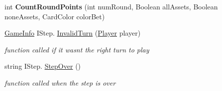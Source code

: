 \begin{DoxyCompactItemize}
\item 
\mbox{\label{class_coinche_1_1_tricks_abd2bd2645b75d22a8c0d96134916c576}} 
int {\bfseries Count\+Round\+Points} (int num\+Round, Boolean all\+Assets, Boolean none\+Assets, Card\+Color color\+Bet)
\item 
\hyperlink{class_coinche_1_1_tools_1_1_game_info}{Game\+Info} I\+Step. \hyperlink{class_coinche_1_1_tricks_a298a3f9c18af5a9e2ab7da3c7509075a}{Invalid\+Turn} (\hyperlink{class_coinche_1_1_player}{Player} player)
\begin{DoxyCompactList}\small\item\em function called if it wasn\textquotesingle{}t the right turn to play \end{DoxyCompactList}\item 
string I\+Step. \hyperlink{class_coinche_1_1_tricks_afa44486bcd0e3ce034330d8c0f0d36eb}{Step\+Over} ()
\begin{DoxyCompactList}\small\item\em function called when the step is over \end{DoxyCompactList}\end{DoxyCompactItemize}
